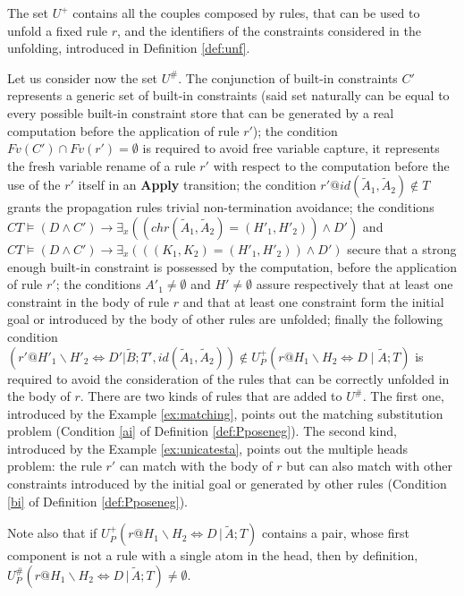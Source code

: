 \documentclass[final]{acmtrans2e}
\begin{document}
The set $U^{+}$ contains all the couples composed by rules, that can be used to unfold a
fixed rule $r$, and the identifiers of the constraints considered in the unfolding,
introduced in Definition \ref{def:unf}.

Let us consider now the set $U^\#$.
The conjunction of built-in constraints $C'$
represents a generic set of built-in constraints
(said set naturally can be equal to every possible built-in constraint store that can
be generated by a real computation before the application of rule $r'$); the
condition $Fv(C')\cap Fv(r')=\emptyset$ is required to avoid free variable capture,
it represents the fresh variable rename of a rule $r'$ with respect to the computation
before the use of the $r'$ itself in an \textbf{Apply} transition;
the condition $r'@id(\tilde A_1, \tilde A_2)\not \in T$ grants the propagation rules
trivial non-termination avoidance;
the conditions $CT \models (D\wedge C') \rightarrow \exists _{x}
((chr(\tilde A_1, \tilde A_2)=(H'_1,  H'_2))\wedge D')$ and
$CT \models (D\wedge C') \rightarrow \exists _{x}
(((K_1, K_2)=(H'_1,  H'_2))\wedge D')$ secure that a strong enough built-in constraint
is possessed by the computation, before the application of rule $r'$;
the conditions $A'_1 \neq \emptyset$ and $H' \neq \emptyset$ assure respectively that
at least one constraint in the body of rule $r$ and that at least
one constraint form the initial goal or introduced by the body of other rules are unfolded;
finally the following condition
$(r'@H'_1\backslash H'_2\Leftrightarrow D'|\tilde B; T', id (\tilde A_1, \tilde A_2))\not\in
U_P^{+}(r@H_1\backslash H_2\Leftrightarrow D\mid \tilde A; T)$ is required
to avoid the consideration of the rules that can be correctly unfolded in the body of $r$.
There are two kinds of rules that are added to $U^\#$.
The first one, introduced by the Example \ref{ex:matching}, points out the
matching substitution problem (Condition \ref{ai} of Definition \ref{def:Pposeneg}).
The second kind, introduced by the Example \ref{ex:unicatesta}, points out the multiple
heads problem: the rule $r'$ can match with the body of $r$ but can also match with
other constraints introduced by the initial goal or generated by other rules
(Condition \ref{bi} of Definition \ref{def:Pposeneg}).

Note also that if $U^{+}_P(r@H_1\backslash H_2 \Leftrightarrow
D\,|\,\tilde A; T )$ contains a pair, whose first component is not
a rule with a single atom in the head, then by definition,
$U^{\#}_P(r@H_1\backslash H_2 \Leftrightarrow D\,|\,\tilde A; T )\neq
\emptyset$.
\end{document}
